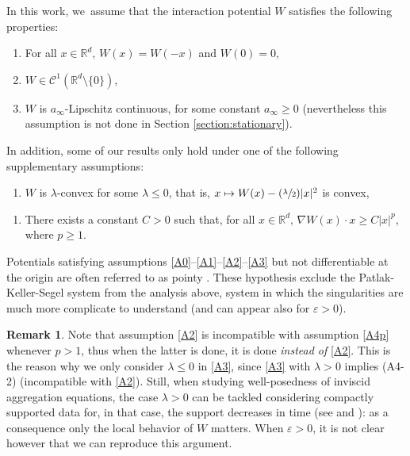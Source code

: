 \documentclass[11pt]{article}
\numberwithin{equation}{section}
\newcommand\mto{\mathchoice{\longmapsto}{\mapsto}{\mapsto}{\mapsto}}
\newcommand{\Psfrac}[2]{(\sfrac{#1}{#2})}
\def\RR{\mathbb{R}}
\def\eps{\varepsilon}
\def\calC{{\mathcal C}}
\theoremstyle{plain}
\theoremstyle{definition}
\newtheorem{remark}[theorem]{Remark}
\begin{document}
In this work, we~assume that the interaction potential $W$ satisfies the following properties:
\begin{enumerate}\renewcommand{\theenumi}{\textup{A}\arabic{enumi}}\setcounter{enumi}{-1}
\item\label{A0}
For all $x \in \RR^d, \, W(x)=W(-x)$ and $W(0)=0$,
\item\label{A1}
$W\in \calC^1(\RR^d\setminus\{0\})$,
\item\label{A2}
$W$ is $a_\infty$-Lipschitz continuous, for some constant $a_\infty \geq 0$ (nevertheless this assumption is not done in Section \ref{section:stationary}).
\end{enumerate}
In addition, some of our results only hold under one of the following supplementary assumptions:
\begin{enumerate}\renewcommand{\theenumi}{\textup{A}\arabic{enumi}}\setcounter{enumi}{2}
\item\label{A3}
$W$ is $\lambda$-convex for some $\lambda \leq 0$, that is, $x \mto W(x) - \Psfrac{\lambda}{2} |x|^2$ is convex,
\end{enumerate}
\begin{enumerate}\renewcommand{\theenumi}{\textup{A}\arabic{enumi}\textup{-}$p$}\setcounter{enumi}{3}
\item\label{A4p}
There exists a constant $C>0$ such that, for all $x \in \RR^d, \,\nabla W(x) \cdot x \geq C |x|^p$, where $p \geq 1$.
\end{enumerate}
Potentials satisfying assumptions \eqref{A0}--\eqref{A1}--\eqref{A2}--\eqref{A3}
but not differentiable at the origin are often referred to as pointy \cite{cjlv15,dlv20,lv17}.
These hypothesis exclude the Patlak-Keller-Segel system from the analysis above, system in which the singularities are much more complicate to understand (and can appear also for
$\varepsilon > 0$).
\begin{remark}
Note that assumption \eqref{A2} is incompatible with assumption \eqref{A4p} whenever $p>1$, thus when the latter is done, it is done {\em instead of} \eqref{A2}. This is the reason why we only consider $\lambda \leq 0$ in \eqref{A3}, since \eqref{A3} with $\lambda>0$ implies (A4-2) (incompatible with \eqref{A2}). Still, when studying well-posedness of inviscid aggregation equations, the case $\lambda >0$ can be tackled considering compactly supported data for, in that case, the support decreases in time (see \cite[Th.\,2.1]{dlv20} and \cite[Rem.\,2.14]{figalli11}): as a consequence only the local behavior of $W$ matters. When $\eps >0$, it is not clear however that we can reproduce this argument.
\end{remark}
\end{document}
